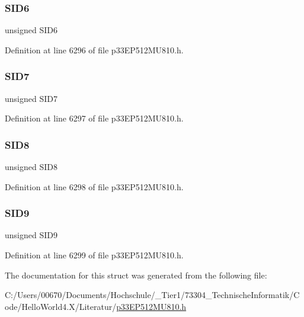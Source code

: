 \subsubsection{\texorpdfstring{S\+I\+D6}{SID6}}
{\footnotesize\ttfamily unsigned S\+I\+D6}



Definition at line 6296 of file p33\+E\+P512\+M\+U810.\+h.

\mbox{\label{structtag_c2_r_x_f2_s_i_d_b_i_t_s_a34097fb76decd431701fa2d86a22328e}} 
\subsubsection{\texorpdfstring{S\+I\+D7}{SID7}}
{\footnotesize\ttfamily unsigned S\+I\+D7}



Definition at line 6297 of file p33\+E\+P512\+M\+U810.\+h.

\mbox{\label{structtag_c2_r_x_f2_s_i_d_b_i_t_s_afe74894633244fdb0b0c01b4e8c522e7}} 
\subsubsection{\texorpdfstring{S\+I\+D8}{SID8}}
{\footnotesize\ttfamily unsigned S\+I\+D8}



Definition at line 6298 of file p33\+E\+P512\+M\+U810.\+h.

\mbox{\label{structtag_c2_r_x_f2_s_i_d_b_i_t_s_a33587704948067005c2a6a3ccc503c99}} 
\subsubsection{\texorpdfstring{S\+I\+D9}{SID9}}
{\footnotesize\ttfamily unsigned S\+I\+D9}



Definition at line 6299 of file p33\+E\+P512\+M\+U810.\+h.



The documentation for this struct was generated from the following file\+:\begin{DoxyCompactItemize}
\item 
C\+:/\+Users/00670/\+Documents/\+Hochschule/\+\_\+\+Tier1/73304\+\_\+\+Technische\+Informatik/\+Code/\+Hello\+World4.\+X/\+Literatur/\hyperlink{p33_e_p512_m_u810_8h}{p33\+E\+P512\+M\+U810.\+h}\end{DoxyCompactItemize}
